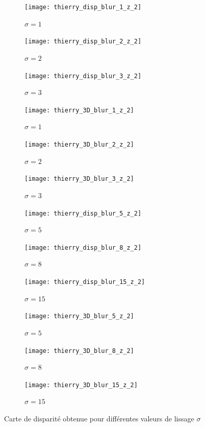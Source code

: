 \documentclass[12pt,a4paper,onecolumn]{article}
\begin{document}
\begin{figure}[H]
	\centering
	\begin{subfigure}[b]{0.3\textwidth}
		\centering
		\texttt{[image: thierry\_disp\_blur\_1\_z\_2]}
		\caption{\(\sigma = 1\)}
		\label{fig_thierry_disp_1}
	\end{subfigure}
	\hfill
	\begin{subfigure}[b]{0.3\textwidth}
		\centering
		\texttt{[image: thierry\_disp\_blur\_2\_z\_2]}
		\caption{\(\sigma = 2\)}
		\label{fig_thierry_disp_2}
	\end{subfigure}
	\hfill
	\begin{subfigure}[b]{0.3\textwidth}
		\centering
		\texttt{[image: thierry\_disp\_blur\_3\_z\_2]}
		\caption{\(\sigma = 3\)}
		\label{fig_thierry_disp_3}
	\end{subfigure}
	\hfill
	\begin{subfigure}[b]{0.3\textwidth}
		\centering
		\texttt{[image: thierry\_3D\_blur\_1\_z\_2]}
		\caption{\(\sigma = 1\)}
		\label{fig_thierry_3D_1}
	\end{subfigure}
	\hfill
	\begin{subfigure}[b]{0.3\textwidth}
		\centering
		\texttt{[image: thierry\_3D\_blur\_2\_z\_2]}
		\caption{\(\sigma = 2\)}
		\label{fig_thierry_3D_1}
	\end{subfigure}
	\hfill
	\begin{subfigure}[b]{0.3\textwidth}
		\centering
		\texttt{[image: thierry\_3D\_blur\_3\_z\_2]}
		\caption{\(\sigma = 3\)}
		\label{fig_thierry_3D_1}
	\end{subfigure}
	\hfill
	\begin{subfigure}[b]{0.3\textwidth}
		\centering
		\texttt{[image: thierry\_disp\_blur\_5\_z\_2]}
		\caption{\(\sigma = 5\)}
		\label{fig_thierry_disp_5}
	\end{subfigure}
	\hfill
	\begin{subfigure}[b]{0.3\textwidth}
		\centering
		\texttt{[image: thierry\_disp\_blur\_8\_z\_2]}
		\caption{\(\sigma = 8\)}
		\label{fig_thierry_disp_8}
	\end{subfigure}
	\hfill
	\begin{subfigure}[b]{0.3\textwidth}
		\centering
		\texttt{[image: thierry\_disp\_blur\_15\_z\_2]}
		\caption{\(\sigma = 15\)}
		\label{fig_thierry_disp_15}
	\end{subfigure}
	\hfill
	\begin{subfigure}[b]{0.3\textwidth}
		\centering
		\texttt{[image: thierry\_3D\_blur\_5\_z\_2]}
		\caption{\(\sigma = 5\)}
		\label{fig_thierry_3D_5}
	\end{subfigure}
	\hfill
	\begin{subfigure}[b]{0.3\textwidth}
		\centering
		\texttt{[image: thierry\_3D\_blur\_8\_z\_2]}
		\caption{\(\sigma = 8\)}
		\label{fig_thierry_3D_8}
	\end{subfigure}
	\hfill
	\begin{subfigure}[b]{0.3\textwidth}
		\centering
		\texttt{[image: thierry\_3D\_blur\_15\_z\_2]}
		\caption{\(\sigma = 15\)}
		\label{fig_thierry_3D_15}
	\end{subfigure}
	\caption{Carte de disparité obtenue pour différentes valeurs de lissage \(\sigma\)}
	\label{fig_thierry}
\end{figure}
\end{document}
